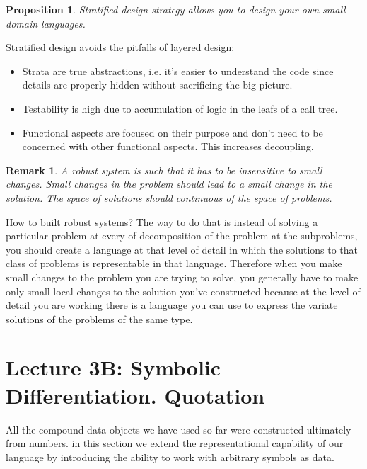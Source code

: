 \documentclass[a4paper,twoside]{article}
\newtheorem{proposition}[theorem]{Proposition}
\newtheorem{remark}[theorem]{Remark}
\numberwithin{equation}{section}
\begin{document}
\begin{proposition}
    Stratified design strategy allows you to design your own small domain languages.
\end{proposition}

Stratified design avoids the pitfalls of layered design:
\begin{itemize}
    \item Strata are true abstractions, i.e. it's easier to understand the code since details are properly hidden without sacrificing the big picture.
    \item Testability is high due to accumulation of logic in the leafs of a call tree.
    \item Functional aspects are focused on their purpose and don't need to be concerned with other functional aspects. This increases decoupling.
\end{itemize}

\begin{remark}
    A robust system is such that it has to be insensitive to small changes. Small changes in the problem should lead to a small change in the solution. The space of solutions should continuous of the space of problems.
\end{remark}
How to built robust systems? The way to do that is instead of solving a particular problem at every of decomposition of the problem at the subproblems, you should create a language at that level of detail in which the solutions to that class of problems is representable in that language. Therefore when you make small changes to the problem you are trying to solve, you generally have to make only small local changes to the solution you've constructed because at the level of detail you are working there is a language you can use to express the variate solutions of the problems of the same type.

\section{Lecture 3B: Symbolic Differentiation. Quotation}
All the compound data objects we have used so far were constructed ultimately from numbers. in this section we extend the representational capability of our language by introducing the ability to work with arbitrary symbols as data.
\end{document}
